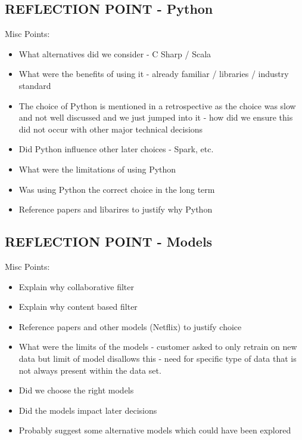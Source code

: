 \documentclass{l3proj}
\begin{document}
\subsection{REFLECTION POINT - Python}
\label{sec:pyreflection}
Misc Points:
\begin{itemize}
\item What alternatives did we consider - C Sharp / Scala
\item What were the benefits of using it - already familiar / libraries / industry standard
\item The choice of Python is mentioned in a retrospective as the choice was slow and not well discussed and we just jumped into it - how did we ensure this did not occur with other major technical decisions
\item Did Python influence other later choices - Spark, etc.
\item What were the limitations of using Python
\item Was using Python the correct choice in the long term 
\item Reference papers and libarires to justify why Python 
\end{itemize}



\subsection{REFLECTION POINT - Models}
\label{sec:modelreflection}
Misc Points:
\begin{itemize}
\item Explain why collaborative filter
\item Explain why content based filter
\item Reference papers and other models (Netflix) to justify choice
\item What were the limits of the models - customer asked to only retrain on new data but limit of model disallows this - need for specific type of data that is not always present within the data set.
\item Did we choose the right models
\item Did the models impact later decisions
\item Probably suggest some alternative models which could have been explored
\end{itemize}
\end{document}
